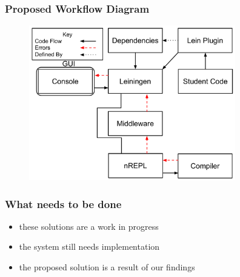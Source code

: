 \documentclass{beamer}
\begin{document}
\begin{frame}[fragile]
\frametitle{Proposed Workflow Diagram}
\begin{figure}[h]
 \includegraphics[width=9cm]{../OurErrorHandlingSystem.pdf}
 \centering
\end{figure}
\end{frame}

\begin{frame}
\frametitle{What needs to be done}
\begin{itemize}
	\item these solutions are a work in progress
	\item the system still needs implementation
	\item the proposed solution is a result of our findings
\end{itemize}
\end{frame}
\end{document}

